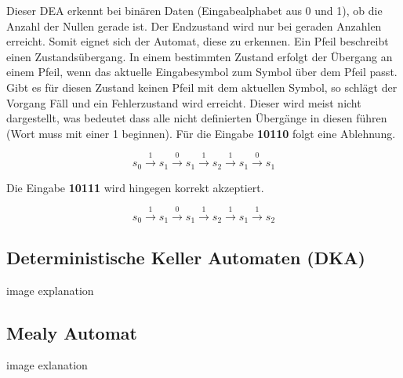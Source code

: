 Dieser DEA erkennt bei binären Daten (Eingabealphabet aus 0 und 1), ob die Anzahl
der Nullen gerade ist. Der Endzustand wird nur bei geraden Anzahlen erreicht.
Somit eignet sich der Automat, diese zu erkennen.
Ein Pfeil beschreibt einen Zustandsübergang. In einem bestimmten Zustand erfolgt
der Übergang an einem Pfeil, wenn das aktuelle Eingabesymbol zum Symbol über dem Pfeil passt.
Gibt es für diesen Zustand keinen Pfeil mit dem aktuellen Symbol, so schlägt der Vorgang
Fäll und ein Fehlerzustand wird erreicht. Dieser wird meist nicht dargestellt, was bedeutet
dass alle nicht definierten Übergänge in diesen führen (Wort muss mit einer 1 beginnen).
Für die Eingabe \textbf{10110} folgt eine Ablehnung.

\Large
\begin{equation*}
    s_0 \overset{1}{\rightarrow} s_1 \overset{0}{\rightarrow} s_1 \overset{1}{\rightarrow}
    s_2 \overset{1}{\rightarrow} s_1 \overset{0}{\rightarrow} s_1 
\end{equation*}
\normalsize

Die Eingabe \textbf{10111} wird hingegen korrekt akzeptiert.

\vspace*{-0.9cm}

\Large
\begin{equation*}
    s_0 \overset{1}{\rightarrow} s_1 \overset{0}{\rightarrow} s_1 \overset{1}{\rightarrow}
    s_2 \overset{1}{\rightarrow} s_1 \overset{1}{\rightarrow} s_2 
\end{equation*}
\normalsize

\subsection{Deterministische Keller Automaten (DKA)}

image
explanation

\subsection{Mealy Automat}

image
exlanation

